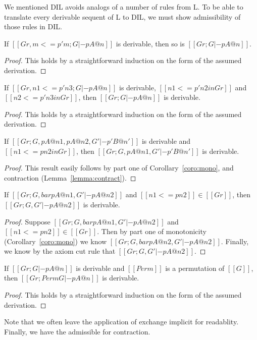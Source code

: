 We mentioned DIL avoids analogs of a number of rules from L.  To be
able to translate every derivable sequent of L to DIL, we must show
admissibility of those rules in DIL.
\begin{lemma}[Reflexivity]
  \label{lemma:reflexivity}
  If $[[Gr, m <=p' m ; G |- p A @ n]]$ is derivable, then so is $[[Gr ; G |- p A @ n]]$.
\end{lemma}
  \begin{proof}
    This holds by a straightforward induction on the form of the assumed derivation.
  \end{proof}

\begin{lemma}[Transitivity]
  \label{lemma:transitivity}
  If $[[Gr, n1 <=p' n3 ; G |- p A @ n]]$ is derivable, $[[n1 <=p' n2 in Gr]]$ and $[[n2 <=p' n3 in Gr]]$, 
  then $[[Gr ; G |- p A @ n]]$ is derivable.
\end{lemma}
  \begin{proof}
    This holds by a straightforward induction on the form of the assumed derivation.
  \end{proof}

\begin{lemma}[MonoL]
  \label{lemma:monol}
  If $[[Gr ; G , p A @ n1 , p A @ n2,G' |- p' B @ n']]$ is derivable and $[[n1 <=p n2 in Gr]]$, then
  $[[Gr ; G , p A @ n1,G' |- p' B @ n']]$ is derivable.
\end{lemma}
\begin{proof}
  This result easily follows by part one of Corollary~\ref{coro:mono}, and contraction (Lemma~\ref{lemma:contract}).
\end{proof}

\begin{lemma}[MonoR]
  \label{lemma:monor}
  If $[[Gr ; G, bar p A @ n1, G' |- p A @ n2]]$ and $[[n1 <= p n2]] \in [[Gr]]$, then 
  $[[Gr ; G, G' |- p A @ n2]]$ is derivable.
\end{lemma}
  \begin{proof}
    Suppose $[[Gr ; G, bar p A @ n1, G' |- p A @ n2]]$ and $[[n1 <= p n2]] \in [[Gr]]$.
    Then by part one of monotonicity (Corollary~\ref{coro:mono}) we know 
    $[[Gr ; G, bar p A @ n2, G' |- p A @ n2]]$.  Finally, we know by the 
    axiom cut rule that $[[Gr ; G, G' |- p A @ n2]]$.    
  \end{proof}

\begin{lemma}[Exchange]
  \label{lemma:exchange}
  If $[[Gr ; G |- p A @ n]]$ is derivable and $[[Perm]]$ is a permutation of $[[G]]$, then
  $[[Gr ; Perm G |- p A @ n]]$ is derivable.
\end{lemma}
  \begin{proof}
    This holds by a straightforward induction on the form of the assumed derivation.
  \end{proof}
\noindent
Note that we often leave the application of exchange implicit for
readablity.  Finally, we have the admissible for contraction.

